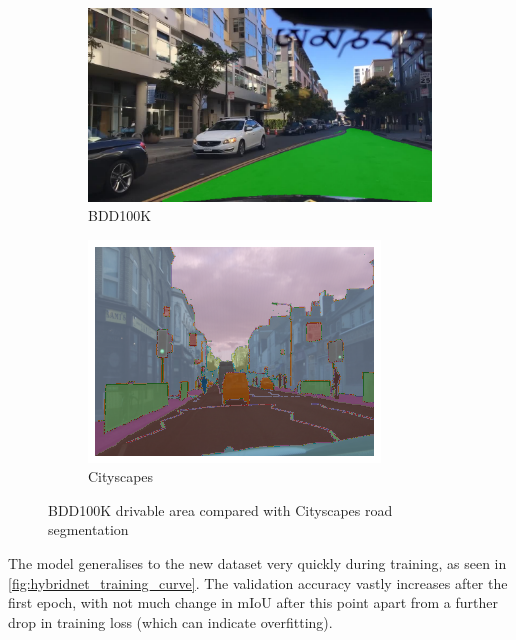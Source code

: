 \begin{figure}[b]
    \centering
    \begin{subfigure}{.45\textwidth}
        \centering
        \includegraphics[width=\linewidth]{images/bdd100k.jpg}
        \caption{BDD100K}
    \end{subfigure}
    \quad
    \begin{subfigure}{.38\textwidth}
        \centering
        \includegraphics[width=\linewidth]{images/cityscapes.png}
        \caption{Cityscapes}
    \end{subfigure}
    \caption{BDD100K drivable area compared with Cityscapes road segmentation}
    \label{fig:dataset_comparison}
\end{figure}

The model generalises to the new dataset very quickly during training,
as seen in \cref{fig:hybridnet_training_curve}. The validation accuracy vastly
increases after the first epoch, with not much change in mIoU after this point
apart from a further drop in training loss (which can indicate overfitting).

